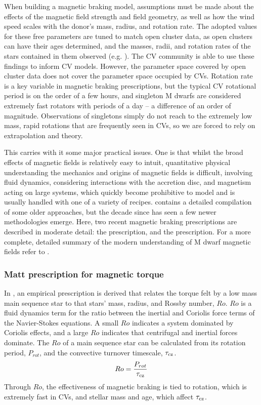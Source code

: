 When building a magnetic braking model, assumptions must be made about the effects of the magnetic field strength and field geometry, as well as how the wind speed scales with the donor's mass, radius, and rotation rate. The adopted values for these free parameters are tuned to match open cluster data, as open clusters can have their ages determined, and the masses, radii, and rotation rates of the stars contained in them observed (e.g. \citealt{matt2015,garraffo2018a}). The CV community is able to use these findings to inform CV models.
However, the parameter space covered by open cluster data does not cover the parameter space occupied by CVs. Rotation rate is a key variable in magnetic braking prescriptions, but the typical CV rotational period is on the order of a few hours, and singleton M dwarfs are considered extremely fast rotators with periods of a day -- a difference of an order of magnitude. Observations of singletons simply do not reach to the extremely low mass, rapid rotations that are frequently seen in CVs, so we are forced to rely on extrapolation and theory.

This carries with it some major practical issues. One is that whilst the broad effects of magnetic fields is relatively easy to intuit, quantitative physical understanding the mechanics and origins of magnetic fields is difficult, involving fluid dynamics, considering interactions with the accretion disc, and magnetism acting on large systems, which quickly become prohibitive to model and is usually handled with one of a variety of recipes. \citealt{knigge11} contains a detailed compilation of some older approaches, but the decade since has seen a few newer methodologies emerge. Here, two recent magnetic braking prescriptions are described in moderate detail: the \citet{matt2015} prescription, and the \citet{garraffo2018a} prescription. For a more complete, detailed summary of the modern understanding of M dwarf magnetic fields refer to \citet{kochukhov2021}. 


\subsubsection{Matt prescription for magnetic torque}
\label{sect:introduction:matt braking}

In \citet{matt2015}, an empirical prescription is derived that relates the torque felt by a low mass main sequence star to that stars' mass, radius, and Rossby number, $Ro$. $Ro$ is a fluid dynamics term for the ratio between the inertial and Coriolis force terms of the Navier-Stokes equations. A small $Ro$ indicates a system dominated by Coriolis effects, and a large $Ro$ indicates that centrifugal and inertial forces dominate. The $Ro$ of a main sequence star can be calculated from its rotation period, $P_{rot}$, and the convective turnover timescale, $\tau_{\rm cz}$.
\begin{equation}
    \label{eqn:introduction:rossby number}
    {Ro} = \frac{P_{rot}}{\tau_{\rm cz}}
\end{equation}
Through $Ro$, the effectiveness of magnetic braking is tied to rotation, which is extremely fast in CVs, and stellar mass and age, which affect $\tau_{\rm cz}$.

